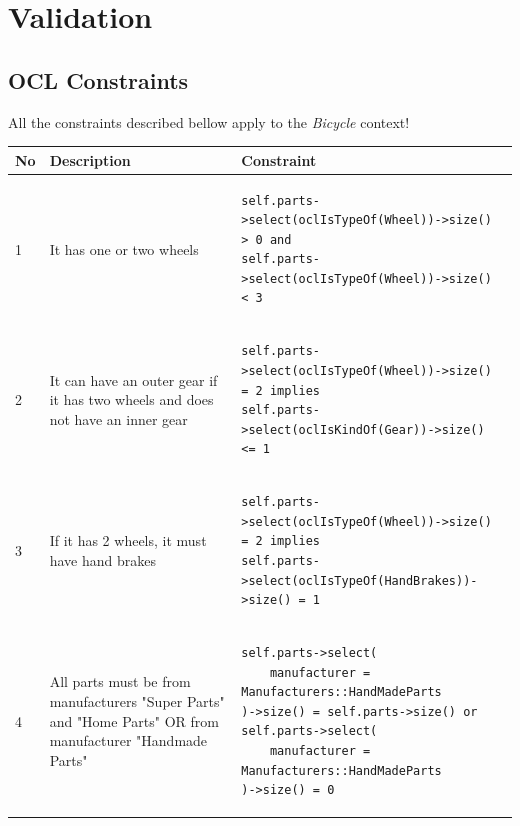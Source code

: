 \section{Validation}
\label{appendix.validation}

\subsection{OCL Constraints}
All the constraints described bellow apply to the \emph{Bicycle} context! 

\begin{table}[htp]
\begin{center}
	\lstset{captionpos=b,language=OCL,numbers=none,basicstyle=\small}
	\lstset{linewidth=.7\textwidth}
	\begin{tabular*}{\textwidth}{p{} p{} l}
	\hline \hline
\textbf{No} & \textbf{Description} & \textbf{Constraint} \\ \hline \hline
1	&	It has one or two wheels &
\begin{lstlisting}
self.parts->select(oclIsTypeOf(Wheel))->size() > 0 and 
self.parts->select(oclIsTypeOf(Wheel))->size() < 3
\end{lstlisting}  \\ 

2	&	It can have an outer gear if it has two wheels and does not have an inner gear &
\begin{lstlisting}
self.parts->select(oclIsTypeOf(Wheel))->size() = 2 implies 
self.parts->select(oclIsKindOf(Gear))->size() <= 1
\end{lstlisting}  \\ 

3	&	If it has 2 wheels, it must have hand brakes &
\begin{lstlisting}
self.parts->select(oclIsTypeOf(Wheel))->size() = 2 implies
self.parts->select(oclIsTypeOf(HandBrakes))->size() = 1
\end{lstlisting}  \\ 

4	&	All parts must be from manufacturers "Super Parts" and "Home Parts" OR from manufacturer "Handmade Parts" &
\begin{lstlisting}
self.parts->select(
	manufacturer = Manufacturers::HandMadeParts
)->size() = self.parts->size() or
self.parts->select(
	manufacturer = Manufacturers::HandMadeParts
)->size() = 0 \end{lstlisting}  \\ 


\end{tabular*}
\end{center}
\end{table}
